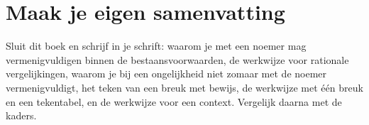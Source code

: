 

\begin{oefeningen}


\end{oefeningen}


\begin{oefeningen}





\end{oefeningen}


\ifzelfstudie
\section*{Maak je eigen samenvatting}
Sluit dit boek en schrijf in je schrift: waarom je met een noemer mag vermenigvuldigen binnen de bestaansvoorwaarden, de werkwijze voor rationale vergelijkingen, waarom je bij een ongelijkheid niet zomaar met de noemer vermenigvuldigt, het teken van een breuk met bewijs, de werkwijze met één breuk en een tekentabel, en de werkwijze voor een context. Vergelijk daarna met de kaders.
\fi
